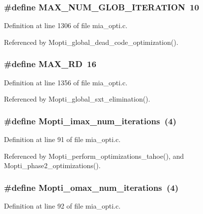\subsubsection{\setlength{\rightskip}{0pt plus 5cm}\#define \bf{MAX\_\-NUM\_\-GLOB\_\-ITERATION}~10}\label{mia__opti_8c_7710e11cc3b7e2b41794e3e16b339039}




Definition at line 1306 of file mia\_\-opti.c.

Referenced by Mopti\_\-global\_\-dead\_\-code\_\-optimization().
\subsubsection{\setlength{\rightskip}{0pt plus 5cm}\#define MAX\_\-RD~16}\label{mia__opti_8c_1ae192442d9e050e872356cd095ae18f}




Definition at line 1356 of file mia\_\-opti.c.

Referenced by Mopti\_\-global\_\-sxt\_\-elimination().
\subsubsection{\setlength{\rightskip}{0pt plus 5cm}\#define Mopti\_\-imax\_\-num\_\-iterations~(4)}\label{mia__opti_8c_995c4a8c06b5e07bb030f4076dfb24e2}




Definition at line 91 of file mia\_\-opti.c.

Referenced by Mopti\_\-perform\_\-optimizations\_\-tahoe(), and Mopti\_\-phase2\_\-optimizations().
\subsubsection{\setlength{\rightskip}{0pt plus 5cm}\#define Mopti\_\-omax\_\-num\_\-iterations~(4)}\label{mia__opti_8c_d3fac62b60f73e33cfe102020c40ea2f}




Definition at line 92 of file mia\_\-opti.c.

